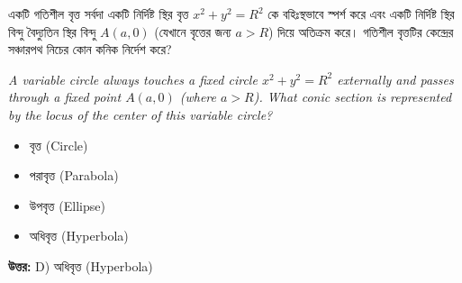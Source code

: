 \documentclass[12pt, a4paper]{article}
\begin{document}
\vspace{2em}

\begin{tcolorbox}[questionbox={প্রশ্ন (Question) 39}]
    \noindent
    একটি গতিশীল বৃত্ত সর্বদা একটি নির্দিষ্ট স্থির বৃত্ত $x^2 + y^2 = R^2$ কে বহিঃস্থভাবে স্পর্শ করে এবং একটি নির্দিষ্ট স্থির বিন্দু বৈদ্যুতিন স্থির বিন্দু $A(a, 0)$ (যেখানে বৃত্তের জন্য $a > R$) দিয়ে অতিক্রম করে। গতিশীল বৃত্তটির কেন্দ্রের সঞ্চারপথ নিচের কোন কনিক নির্দেশ করে?
    
    \vspace{0.8em}
    \begin{english}
    \noindent\textit{\color{darkgray}
    A variable circle always touches a fixed circle $x^2 + y^2 = R^2$ externally and passes through a fixed point $A(a, 0)$ (where $a > R$). What conic section is represented by the locus of the center of this variable circle?
    }
    \end{english}
\end{tcolorbox}

\begin{itemize}[label={}, leftmargin=1cm, itemsep=0.5em]
    \item[\textbf{A)}] বৃত্ত (Circle)
    \item[\textbf{B)}] পরাবৃত্ত (Parabola)
    \item[\textbf{C)}] উপবৃত্ত (Ellipse)
    \item[\textbf{D)}] অধিবৃত্ত (Hyperbola)
\end{itemize}

\vspace{0.5em}
\begin{tcolorbox}[answerbox]
    \textbf{\color{success} উত্তর:} D) অধিবৃত্ত (Hyperbola)
\end{tcolorbox}
\vspace{1em}
\end{document}
